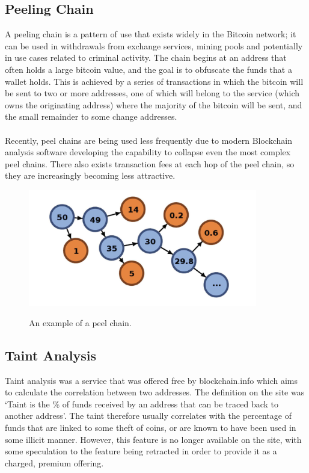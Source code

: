 \subsection{Peeling Chain}\label{background-peeling-chain}
A peeling chain is a pattern of use that exists widely in the Bitcoin network; it can be used in withdrawals from exchange services, mining pools and potentially in use cases related to criminal activity. The chain begins at an address that often holds a large bitcoin value, and the goal is to obfuscate the funds that a wallet holds. This is achieved by a series of transactions in which the bitcoin will be sent to two or more addresses, one of which will belong to the service (which owns the originating address) where the majority of the bitcoin will be sent, and the small remainder to some change addresses. 
\\\\
Recently, peel chains are being used less frequently due to modern Blockchain analysis software developing the capability to collapse even the most complex peel chains. There also exists transaction fees at each hop of the peel chain, so they are increasingly becoming less attractive. 
\begin{figure}[h!]
  \centering
  \includegraphics[width = 10cm]{./figures/peel-chain}\\[0.5cm] 
  \caption{An example of a peel chain. \cite{RefWorks:doc:5c3db214e4b0854ae6124c26}}
  \label{fig:peel-chain}
\end{figure}


\subsection{Taint Analysis}\label{background-taint}
Taint analysis was a service that was offered free by blockchain.info which aims to calculate the correlation between two addresses. The definition on the site was \lq Taint is the \% of funds received by an address that can be traced back to another address\rq. The taint therefore usually correlates with the percentage of funds that are linked to some theft of coins, or are known to have been used in some illicit manner. However, this feature is no longer available on the site, with some speculation to the feature being retracted in order to provide it as a charged, premium offering. 

